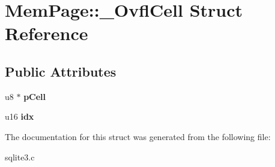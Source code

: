\hypertarget{struct_mem_page_1_1___ovfl_cell}{\section{Mem\-Page\-:\-:\-\_\-\-Ovfl\-Cell Struct Reference}
\label{struct_mem_page_1_1___ovfl_cell}
}
\subsection*{Public Attributes}
\begin{DoxyCompactItemize}
\item 
\hypertarget{struct_mem_page_1_1___ovfl_cell_a75c64097a5af396bbdc30e859f33a7c9}{u8 $\ast$ {\bfseries p\-Cell}}\label{struct_mem_page_1_1___ovfl_cell_a75c64097a5af396bbdc30e859f33a7c9}

\item 
\hypertarget{struct_mem_page_1_1___ovfl_cell_ad10c93756d29693601aa63923a7fbee3}{u16 {\bfseries idx}}\label{struct_mem_page_1_1___ovfl_cell_ad10c93756d29693601aa63923a7fbee3}

\end{DoxyCompactItemize}


The documentation for this struct was generated from the following file\-:\begin{DoxyCompactItemize}
\item 
sqlite3.\-c\end{DoxyCompactItemize}

